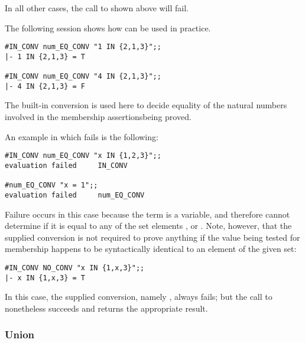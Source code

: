 \noindent In all other cases, the call to  shown above will fail.

The following session shows how  can be used in practice.

\setcounter{sessioncount}{1}
\begin{session}\begin{verbatim}
#IN_CONV num_EQ_CONV "1 IN {2,1,3}";;
|- 1 IN {2,1,3} = T

#IN_CONV num_EQ_CONV "4 IN {2,1,3}";;
|- 4 IN {2,1,3} = F
\end{verbatim}\end{session}

\noindent The built-in conversion  is used here to decide
equality of the natural numbers involved in the membership
assertions\pagebreak[3] being proved.

An example in which  fails is the following:

\begin{session}\begin{verbatim}
#IN_CONV num_EQ_CONV "x IN {1,2,3}";;
evaluation failed     IN_CONV

#num_EQ_CONV "x = 1";;
evaluation failed     num_EQ_CONV
\end{verbatim}\end{session}

\noindent Failure occurs in this case because the term  is a variable,
and  therefore cannot determine if it is equal to any of the
set elements ,  or .  Note, however, that the supplied
conversion is not required to prove anything if the value being tested for
membership happens to be syntactically identical to an element of the given
set:

\begin{session}\begin{verbatim}
#IN_CONV NO_CONV "x IN {1,x,3}";;
|- x IN {1,x,3} = T
\end{verbatim}\end{session}

\noindent In this case, the supplied conversion, namely , always
fails; but the call to  nonetheless succeeds and returns the
appropriate result.%

\subsubsection{Union}

